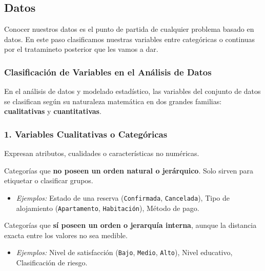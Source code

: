 \subsection{Datos}
Conocer nuestros datos es el punto de partida de cualquier problema basado en datos. En este paso clasificamos nuestras variables entre categóricas o continuas por el tratamineto posterior que les vamos a dar.

\subsubsection{Clasificación de Variables en el Análisis de Datos}

En el análisis de datos y modelado estadístico, las variables del conjunto de datos se clasifican según su naturaleza matemática en dos grandes familias: \textbf{cualitativas} y \textbf{cuantitativas}.

\subsubsection{1. Variables Cualitativas o Categóricas}
Expresan atributos, cualidades o características no numéricas.
\begin{description}[leftmargin=1.5em, labelindent=0.5em]
    \item[Nominales:] Categorías que \textbf{no poseen un orden natural o jerárquico}. Solo sirven para etiquetar o clasificar grupos.
    \begin{itemize}
        \item \textit{Ejemplos:} Estado de una reserva (\texttt{Confirmada}, \texttt{Cancelada}), Tipo de alojamiento (\texttt{Apartamento}, \texttt{Habitación}), Método de pago.
    \end{itemize}
    \item[Ordinales:] Categorías que \textbf{sí poseen un orden o jerarquía interna}, aunque la distancia exacta entre los valores no sea medible.
    \begin{itemize}
        \item \textit{Ejemplos:} Nivel de satisfacción (\texttt{Bajo}, \texttt{Medio}, \texttt{Alto}), Nivel educativo, Clasificación de riesgo.
    \end{itemize}
\end{description}

